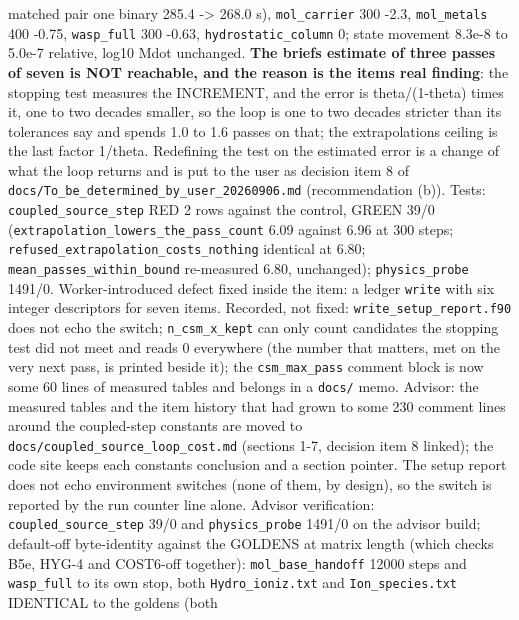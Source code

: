 \documentclass[english,a4paper]{my_memo}
\begin{document}
\begin{itemize}
  matched pair one binary 285.4 -\textgreater{} 268.0 s), \texttt{mol\_carrier} 300 -2.3,
  \texttt{mol\_metals} 400 -0.75, \texttt{wasp\_full} 300 -0.63, \texttt{hydrostatic\_column} 0;
  state movement 8.3e-8 to 5.0e-7 relative, log10 Mdot unchanged. \textbf{The
  brief\textquotesingle s estimate of three passes of seven is NOT reachable, and the reason
  is the item\textquotesingle s real finding}: the stopping test measures the INCREMENT,
  and the error is \textbar theta/(1-theta)\textbar{} times it, one to two decades smaller,
  so the loop is one to two decades stricter than its tolerances say and
  spends 1.0 to 1.6 passes on that; the extrapolation\textquotesingle s ceiling is the last
  factor 1/\textbar theta\textbar. Redefining the test on the estimated error is a change
  of what the loop returns and is put to the user as decision item 8 of
  \texttt{docs/To\_be\_determined\_by\_user\_20260906.md} (recommendation (b)). Tests:
  \texttt{coupled\_source\_step} RED 2 rows against the control, GREEN 39/0
  (\texttt{extrapolation\_lowers\_the\_pass\_count} 6.09 against 6.96 at 300 steps;
  \texttt{refused\_extrapolation\_costs\_nothing} identical at 6.80;
  \texttt{mean\_passes\_within\_bound} re-measured 6.80, unchanged); \texttt{physics\_probe}
  1491/0. Worker-introduced defect fixed inside the item: a ledger \texttt{write}
  with six integer descriptors for seven items. Recorded, not fixed:
  \texttt{write\_setup\_report.f90} does not echo the switch; \texttt{n\_csm\_x\_kept} can only
  count candidates the stopping test did not meet and reads 0 everywhere
  (the number that matters, met on the very next pass, is printed beside
  it); the \texttt{csm\_max\_pass} comment block is now some 60 lines of measured
  tables and belongs in a \texttt{docs/} memo.
  Advisor: the measured tables and the item history that had grown to some
  230 comment lines around the coupled-step constants are moved to
  \texttt{docs/coupled\_source\_loop\_cost.md} (sections 1-7, decision item 8 linked);
  the code site keeps each constant\textquotesingle s conclusion and a section pointer. The
  setup report does not echo environment switches (none of them, by
  design), so the switch is reported by the run counter line alone. Advisor
  verification: \texttt{coupled\_source\_step} 39/0 and \texttt{physics\_probe} 1491/0 on the
  advisor build; default-off byte-identity against the GOLDENS at matrix
  length (which checks B5e, HYG-4 and COST6-off together):
  \texttt{mol\_base\_handoff} 12000 steps and \texttt{wasp\_full} to its own stop, both
  \texttt{Hydro\_ioniz.txt} and \texttt{Ion\_species.txt} IDENTICAL to the goldens (both

\end{itemize}
\end{document}
